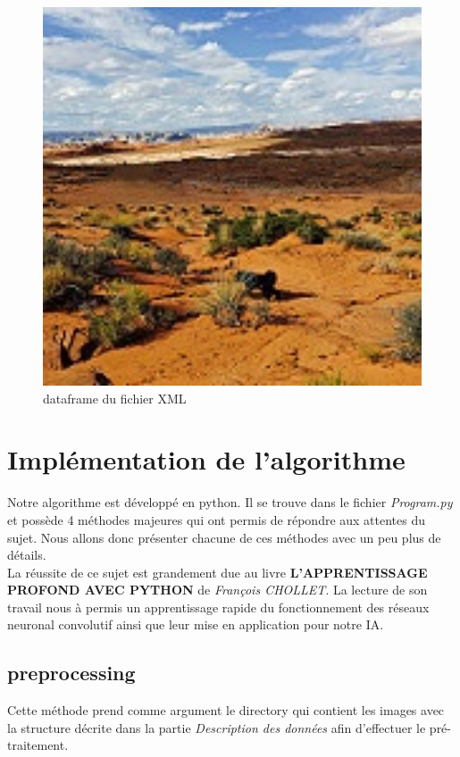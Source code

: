 \documentclass[12pt ,a4paper ]{article}
\begin{document}
\begin{multicols}{2}
\begin{figure}[th]
    \begin{center}
        \includegraphics[width=1\textwidth]{3808.jpg}
    \end{center}
\caption{\small{dataframe du fichier XML}}
\end{figure}
\newpage

\section{Implémentation de l'algorithme}
Notre algorithme est développé en python. Il se trouve dans le fichier \textit{Program.py} et possède 4 méthodes majeures qui ont permis de répondre aux attentes du sujet. Nous allons donc présenter chacune de ces méthodes avec un peu plus de détails. \\

La réussite de ce sujet est grandement due au livre \textbf{L'APPRENTISSAGE PROFOND AVEC PYTHON} de \textit{François CHOLLET}. La lecture de son travail nous à permis un apprentissage rapide du fonctionnement des réseaux neuronal convolutif ainsi que leur mise en application pour notre IA. 

\subsection{preprocessing}
Cette méthode prend comme argument le directory qui contient les images avec la structure décrite dans la partie \textit{Description des données} afin d'effectuer le pré-traitement. \\


\end{multicols}
\end{document}
